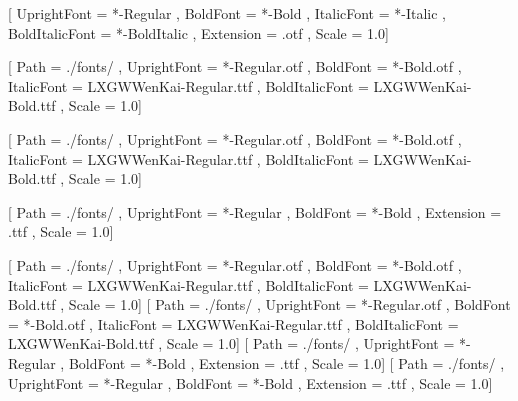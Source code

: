 \usepackage{unicode-math}


\setmainfont{STIXTwoText}[
    UprightFont = *-Regular ,
    BoldFont = *-Bold ,
    ItalicFont = *-Italic ,
    BoldItalicFont = *-BoldItalic ,
    Extension = .otf ,
    Scale = 1.0]

[
   Path = ./fonts/ ,
   UprightFont = *-Regular.otf ,
   BoldFont = *-Bold.otf ,
   ItalicFont = LXGWWenKai-Regular.ttf ,
   BoldItalicFont = LXGWWenKai-Bold.ttf ,
   Scale = 1.0]

[
   Path = ./fonts/ ,
   UprightFont = *-Regular.otf ,
   BoldFont = *-Bold.otf ,
   ItalicFont = LXGWWenKai-Regular.ttf ,
   BoldItalicFont = LXGWWenKai-Bold.ttf ,
   Scale = 1.0]

[
   Path = ./fonts/ ,
   UprightFont = *-Regular ,
   BoldFont = *-Bold ,
   Extension = .ttf ,
   Scale = 1.0]

[
    Path = ./fonts/ ,
    UprightFont = *-Regular.otf ,
    BoldFont = *-Bold.otf ,
    ItalicFont = LXGWWenKai-Regular.ttf ,
    BoldItalicFont = LXGWWenKai-Bold.ttf ,
    Scale = 1.0]
[
    Path = ./fonts/ ,
    UprightFont = *-Regular.otf ,
    BoldFont = *-Bold.otf ,
    ItalicFont = LXGWWenKai-Regular.ttf ,
    BoldItalicFont = LXGWWenKai-Bold.ttf ,
    Scale = 1.0]
[
    Path = ./fonts/ ,
    UprightFont = *-Regular ,
    BoldFont = *-Bold ,
    Extension = .ttf ,
    Scale = 1.0]
[
    Path = ./fonts/ ,
    UprightFont = *-Regular ,
    BoldFont = *-Bold ,
    Extension = .ttf ,
    Scale = 1.0]
\renewcommand*{\songti}{\CJKfamily{zhsong}}
\renewcommand*{\heiti}{\CJKfamily{zhhei}}
\renewcommand*{\kaishu}{\CJKfamily{zhkai}}
\renewcommand*{\fangsong}{\CJKfamily{zhfs}}

\usepackage{minted}
\usepackage[color=black]{siunitx}
\usepackage[ISO]{diffcoeff}
\usepackage{tikz}
\usepackage{tkz-euclide}
\usepackage{tkz-graph}
\usepackage{dashrule}
\usepackage{float}
\usepackage{fontawesome}
\usepackage{multirow}
\usepackage{longtable}


\newcommand{\qed}{\hfill$\QED$}


